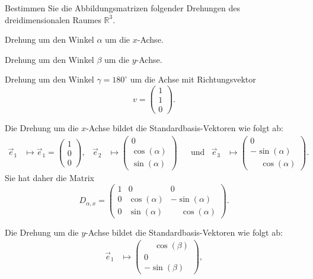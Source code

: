 Bestimmen Sie die Abbildungsmatrizen folgender Drehungen des dreidimensionalen Raumes $\mathbb{R}^3$.
\begin{teilaufgaben}
\item Drehung um den Winkel $\alpha$ um die $x$-Achse.
\item Drehung um den Winkel $\beta$ um die $y$-Achse.
\item Drehung um den Winkel $\gamma=180^\circ$ um die Achse mit Richtungsvektor
\[
v=\begin{pmatrix}1\\1\\0\end{pmatrix}.
\]
\end{teilaufgaben}


\begin{loesung}
\begin{teilaufgaben}
\item Die Drehung um die $x$-Achse bildet die Standardbasis-Vektoren wie folgt ab:
\[
\begin{aligned}
\vec e_1&\mapsto \vec e_1 = \begin{pmatrix}1\\0\\0\end{pmatrix},
&
\vec e_2&\mapsto \begin{pmatrix}0\\\cos(\alpha)\\\sin(\alpha)\end{pmatrix}
&&\text{und}
&
\vec e_3&\mapsto \begin{pmatrix}0\\-\sin(\alpha)\\\phantom{-}\cos(\alpha)\end{pmatrix}.
\end{aligned}
\]
Sie hat daher die Matrix
\[
D_{\alpha,x}
=
\begin{pmatrix}
1&0& 0\\
0&\cos(\alpha)& -\sin(\alpha)\\
0&\sin(\alpha)&\phantom{-}\cos(\alpha)
\end{pmatrix}.
\]
\item Die Drehung um die $y$-Achse bildet die Standardbasis-Vektoren wie folgt ab:
\[
\begin{aligned}
\vec e_1&\mapsto \begin{pmatrix}\phantom{-}\cos(\beta)\\0\\-\sin(\beta)\end{pmatrix},

\end{aligned}\]
\end{teilaufgaben}
\end{loesung}
